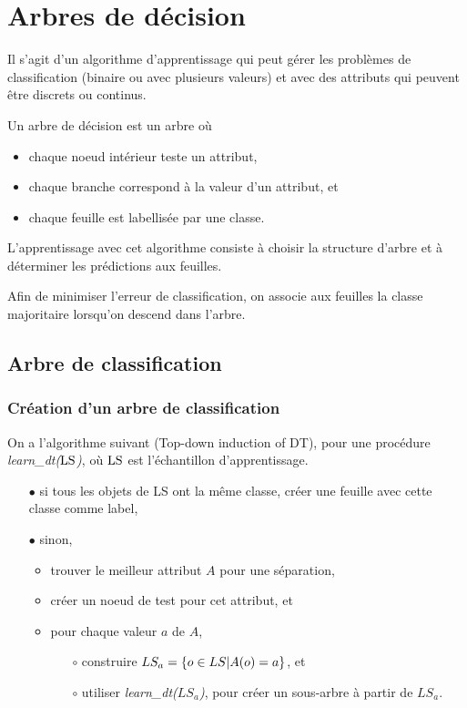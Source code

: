 \chapter{Arbres de décision}

Il s'agit d'un algorithme d'apprentissage qui peut gérer les problèmes de classification (binaire ou avec plusieurs valeurs) et avec des attributs qui peuvent être discrets ou continus.

Un arbre de décision est un arbre où

\begin{itemize}
	\item chaque noeud intérieur teste un attribut,
	\item chaque branche correspond à la valeur d'un attribut, et
	\item chaque feuille est labellisée par une classe.
\end{itemize}


L'apprentissage avec cet algorithme consiste à choisir la structure d'arbre et à déterminer les prédictions aux feuilles.

Afin de minimiser l'erreur de classification, on associe aux feuilles la classe majoritaire lorsqu'on descend dans l'arbre.

\section{Arbre de classification}
	\subsection{Création d'un arbre de classification}
	
	On a l'algorithme suivant (Top-down induction of DT), pour une procédure \textit{learn\_dt($\text{LS}$)}, où $\text{LS}$ est l'échantillon d'apprentissage.
	
	\begin{itemize}
		\item[$\bullet$] si tous les objets de LS ont la même classe, créer une feuille avec cette classe comme label,
		\item[$\bullet$] sinon,
		\begin{itemize}
			\item trouver le meilleur attribut $A$ pour une séparation,
			\item créer un noeud de test pour cet attribut, et
			\item pour chaque valeur $a$ de $A$,
			\begin{itemize}
				\item[$\circ$] construire $LS_a = \lbrace o \in LS \vert A(o) = a \rbrace$, et
				\item[$\circ$] utiliser \textit{learn\_dt($LS_a$)}, pour créer un sous-arbre à partir de $LS_a$.
			\end{itemize}
		\end{itemize}
	\end{itemize}
	
